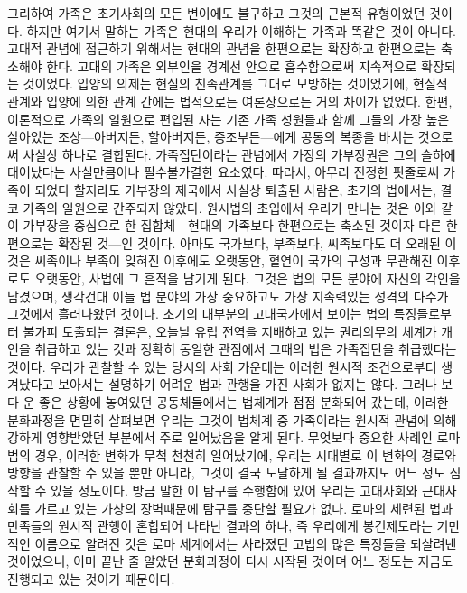 그리하여 가족은 초기사회의 모든 변이에도 불구하고
그것의 근본적 유형이었던 것이다.
하지만 여기서 말하는 가족은 현대의 우리가 이해하는 가족과 똑같은 것이 아니다.
고대적 관념에 접근하기 위해서는 현대의 관념을 한편으로는 확장하고
한편으로는 축소해야 한다.
고대의 가족은
외부인을 경계선 안으로 흡수함으로써
지속적으로 확장되는 것이었다.
입양의 의제는 현실의 친족관계를 그대로 모방하는 것이었기에,
현실적 관계와 입양에 의한 관계 간에는
법적으로든 여론상으로든
거의 차이가 없었다.
한편, 이론적으로 가족의 일원으로 편입된 자는
기존 가족 성원들과 함께 그들의 가장 높은 살아있는 조상---아버지든,
할아버지든, 증조부든---에게
공통의 복종을 바치는 것으로써 사실상 하나로 결합된다.
가족집단이라는 관념에서 가장의 가부장권은
그의 슬하에 태어났다는 사실만큼이나
필수불가결한 요소였다.
따라서, 아무리 진정한 핏줄로써 가족이 되었다 할지라도
가부장의 제국에서 사실상 퇴출된 사람은,
초기의 법에서는,
결코 가족의 일원으로 간주되지 않았다.
원시법의 초입에서 우리가 만나는 것은
이와 같이 가부장을 중심으로 한 집합체---현대의 가족보다
한편으로는 축소된 것이자 다른 한편으로는 확장된 것---인 것이다.
아마도 국가보다, 부족보다, 씨족보다도 더 오래된 이것은
씨족이나 부족이 잊혀진 이후에도 오랫동안,
혈연이 국가의 구성과 무관해진 이후로도 오랫동안,
사법에 그 흔적을 남기게 된다.
그것은 법의 모든 분야에 자신의 각인을 남겼으며,
생각건대 이들 법 분야의 가장 중요하고도 가장 지속력있는 성격의 다수가
그것에서 흘러나왔던 것이다.
초기의 대부분의 고대국가에서 보이는 법의 특징들로부터 불가피 도출되는 결론은,
오늘날 유럽 전역을 지배하고 있는 권리의무의 체계가 개인을 취급하고 있는 것과
정확히 동일한 관점에서 그때의 법은 가족집단을 취급했다는 것이다.
우리가 관찰할 수 있는 당시의 사회 가운데는
이러한 원시적 조건으로부터 생겨났다고 보아서는
설명하기 어려운 법과 관행을 가진 사회가 없지는 않다.
그러나 보다 운 좋은 상황에 놓여있던 공동체들에서는
법체계가 점점 분화되어 갔는데,
이러한 분화과정을 면밀히 살펴보면
우리는
그것이 법체계 중 가족이라는 원시적 관념에 의해 강하게 영향받았던 부분에서
주로 일어났음을 알게 된다.
무엇보다 중요한 사례인 로마법의 경우,
이러한 변화가 무척 천천히 일어났기에,
우리는 시대별로 이 변화의 경로와 방향을 관찰할 수 있을 뿐만 아니라,
그것이 결국 도달하게 될 결과까지도 어느 정도 짐작할 수 있을
정도이다.
방금 말한 이 탐구를 수행함에 있어 우리는 고대사회와 근대사회를
가르고 있는 가상의 장벽때문에 탐구를 중단할 필요가 없다.
로마의 세련된 법과 만족들의 원시적 관행이 혼합되어
나타난 결과의 하나, 즉 우리에게 봉건제도라는 기만적인 이름으로 알려진 것은
로마 세계에서는 사라졌던 고법의 많은 특징들을 되살려낸 것이었으니,
이미 끝난 줄 알았던 분화과정이 다시 시작된 것이며 어느 정도는 지금도
진행되고 있는 것이기 때문이다.

